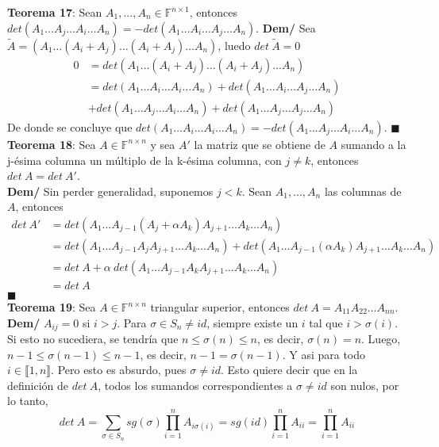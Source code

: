 \documentclass[11pt,a4paper]{article}
\newcommand*{\QEDA}{\null\nobreak\hfill\ensuremath{\blacksquare}}
\begin{document}
\textbf{Teorema 17}: Sean $A_1, ..., A_n \in \mathbb{F}^{n \times 1}$, entonces 
$det(A_1 \hdots A_j \hdots A_i \hdots A_n) = -det(A_1 \hdots A_i \hdots A_j \hdots A_n)$.
\textbf{Dem/} Sea $\tilde{A} = (A_1 \hdots (A_i + A_j) \hdots (A_i + A_j) \hdots A_n)$, luedo $det\ \tilde{A} = 0$
\begin{align*}
0 
&= det (A_1 \hdots (A_i + A_j) \hdots (A_i + A_j) \hdots A_n)\\
&= det (A_1 \hdots A_i \hdots A_i\hdots A_n) + det (A_1 \hdots A_i \hdots A_j \hdots A_n) \\ & + det (A_1 \hdots A_j \hdots A_i \hdots A_n) + det (A_1 \hdots A_j \hdots A_j \hdots A_n)
\end{align*}
De donde se concluye que $det (A_1 \hdots A_i \hdots A_i\hdots A_n) = - det (A_1 \hdots A_j \hdots A_i \hdots A_n)$. \QEDA\\

\textbf{Teorema 18}: Sea $A \in \mathbb{F}^{n \times n}$ y sea $A'$ la matriz que se obtiene de $A$ sumando a la j-\'esima columna un m\'ultiplo de la k-\'esima columna, con $j \not = k$, entonces $det\ A = det\ A'$.\\
\textbf{Dem/} Sin perder generalidad, suponemos $j < k$. Sean $A_1,...,A_n$ las columnas de $A$, entonces
\begin{align*}
det\ A' 
&= det (A_1 \hdots A_{j-1} (A_j + \alpha A_k) A_{j+1} \hdots A_k \hdots A_n) \\
&= det (A_1 \hdots A_{j-1} A_j A_{j+1} \hdots A_k \hdots A_n) + det (A_1 \hdots A_{j-1} (\alpha A_k) A_{j+1} \hdots A_k \hdots A_n) \\
&= det\ A + \alpha\ det (A_1 \hdots A_{j-1} A_k A_{j+1} \hdots A_k \hdots A_n) \\
&= det\ A
\end{align*}
\QEDA\\

\textbf{Teorema 19}: Sea $A \in \mathbb{F}^{n \times n}$ triangular superior, entonces $det\ A = A_{11}A_{22}\hdots A_{nn}$.\\
\textbf{Dem/} $A_{ij} = 0$ si $i > j$. Para $\sigma \in S_n \not = id$, siempre existe un $i$ tal que $i > \sigma(i)$. Si esto no sucediera, se tendr\'ia que $n \leq \sigma(n) \leq n$, es decir, $\sigma(n) = n$. Luego, $n-1 \leq \sigma(n - 1) \leq n-1$, es decir, $n-1 = \sigma(n - 1)$. Y asi para todo $i \in \llbracket 1,n \rrbracket$. Pero esto es absurdo, pues $\sigma \not = id$. Esto quiere decir que en la definici\'on de $det\ A$, todos los sumandos correspondientes a $\sigma \not = id$ son nulos, por lo tanto, $$det\ A = \sum_{\sigma \in S_n} sg(\sigma) \prod_{i = 1}^n A_{i\sigma(i)} = sg(id) \prod_{i=1}^n A_{ii} = \prod_{i=1}^nA_{ii}$$
\end{document}
